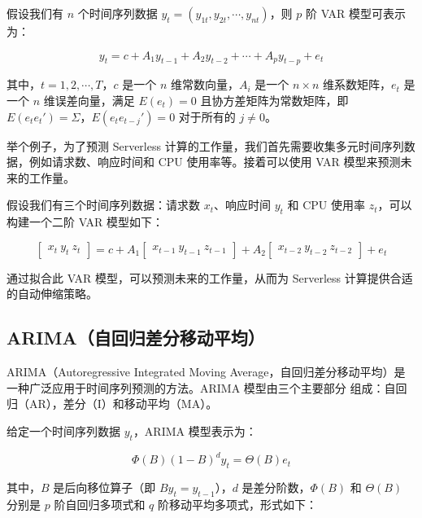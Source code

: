 \documentclass[a4paper,AutoFakeBold,oneside,12pt]{book}
\begin{document}
假设我们有 $n$ 个时间序列数据 $y_t = (y_{1t}, y_{2t}, \cdots, y_{nt})$，则 $p$ 阶 VAR 模型可表示为：

\begin{equation}
y_t = c + A_1 y_{t-1} + A_2 y_{t-2} + \cdots + A_p y_{t-p} + e_t
\end{equation}

其中，$t = 1, 2, \cdots, T$，$c$ 是一个 $n$ 维常数向量，$A_i$ 是一个 $n \times n$ 维系数矩阵，$e_t$ 是一个 $n$ 维误差向量，满足 $E(e_t) = 0$ 且协方差矩阵为常数矩阵，即 $E(e_t e_t') = \Sigma$，$E(e_t e_{t-j}') = 0$ 对于所有的 $j \neq 0$。

举个例子，为了预测 Serverless 计算的工作量，我们首先需要收集多元时间序列数据，例如请求数、响应时间和 CPU 使用率等。接着可以使用 VAR 模型来预测未来的工作量。

假设我们有三个时间序列数据：请求数 $x_t$、响应时间 $y_t$ 和 CPU 使用率 $z_t$，可以构建一个二阶 VAR 模型如下：

\begin{equation}
\begin{bmatrix}
x_t \
y_t \
z_t
\end{bmatrix} =
c + A_1
\begin{bmatrix}
x_{t-1} \
y_{t-1} \
z_{t-1}
\end{bmatrix} +
A_2
\begin{bmatrix}
x_{t-2} \
y_{t-2} \
z_{t-2}
\end{bmatrix} + e_t
\end{equation}

通过拟合此 VAR 模型，可以预测未来的工作量，从而为 Serverless 计算提供合适的自动伸缩策略。

\subsection{ARIMA（自回归差分移动平均）}


ARIMA（Autoregressive Integrated Moving Average，自回归差分移动平均）是一种广泛应用于时间序列预测的方法。ARIMA 模型由三个主要部分
组成：自回归（AR），差分（I）和移动平均（MA）。

给定一个时间序列数据 $y_t$，ARIMA 模型表示为\cite{arima_demand_forecast_2019}：

\begin{equation}
\Phi(B)(1-B)^d y_t = \Theta(B) e_t
\end{equation}

其中，$B$ 是后向移位算子（即 $B y_t = y_{t-1}$），$d$ 是差分阶数，$\Phi(B)$ 和 $\Theta(B)$ 分别是 $p$ 阶自回归多项式和 $q$ 阶移动平均多项式，形式如下：
\end{document}
